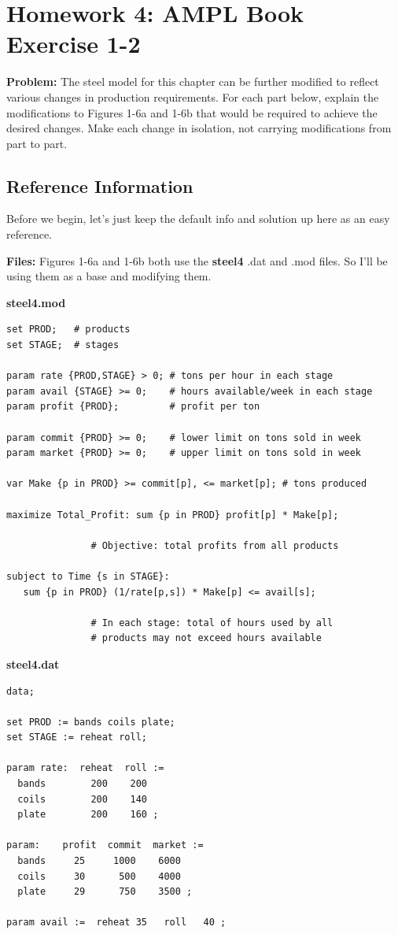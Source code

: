 \section*{Homework 4: AMPL Book Exercise 1-2}

\textbf{Problem:} The steel model for this chapter can be further modified to reflect various changes in production requirements. For each part below, explain the modifications to Figures 1-6a and 1-6b that would be required to achieve the desired changes. Make each change in isolation, not carrying modifications from part to part. 

\subsection*{Reference Information}

Before we begin, let's just keep the default info and solution up here as an easy reference. 

\noindent\textbf{Files:} Figures 1-6a and 1-6b both use the \textbf{steel4} .dat and .mod files. So I'll be using them as a base and modifying them. 

\noindent\textbf{steel4.mod}

\begin{lstlisting}
set PROD;   # products
set STAGE;  # stages

param rate {PROD,STAGE} > 0; # tons per hour in each stage
param avail {STAGE} >= 0;    # hours available/week in each stage
param profit {PROD};         # profit per ton

param commit {PROD} >= 0;    # lower limit on tons sold in week
param market {PROD} >= 0;    # upper limit on tons sold in week

var Make {p in PROD} >= commit[p], <= market[p]; # tons produced

maximize Total_Profit: sum {p in PROD} profit[p] * Make[p];

               # Objective: total profits from all products

subject to Time {s in STAGE}:
   sum {p in PROD} (1/rate[p,s]) * Make[p] <= avail[s];

               # In each stage: total of hours used by all
               # products may not exceed hours available

\end{lstlisting}

\noindent\textbf{steel4.dat}

\begin{lstlisting}
data;

set PROD := bands coils plate;
set STAGE := reheat roll;

param rate:  reheat  roll :=
  bands        200    200
  coils        200    140
  plate        200    160 ;

param:    profit  commit  market :=
  bands     25     1000    6000
  coils     30      500    4000
  plate     29      750    3500 ;

param avail :=  reheat 35   roll   40 ;
\end{lstlisting}


